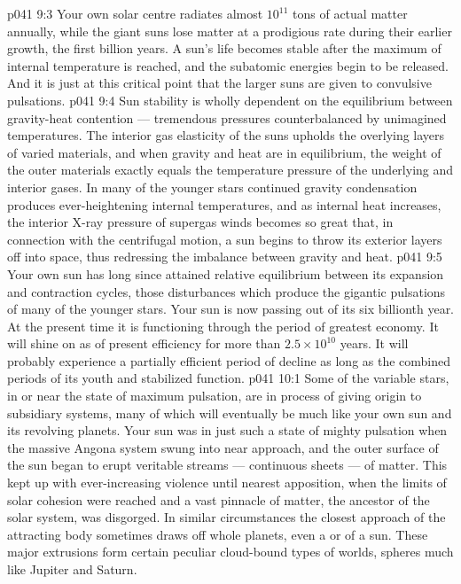 \vs p041 9:3 \pc Your own solar centre radiates almost $10^{11}$ tons of actual matter annually, while the giant suns lose matter at a prodigious rate during their earlier growth, the first billion years. A sun’s life becomes stable after the maximum of internal temperature is reached, and the subatomic energies begin to be released. And it is just at this critical point that the larger suns are given to convulsive pulsations.
\vs p041 9:4 Sun stability is wholly dependent on the equilibrium between gravity\hyp{}heat contention --- tremendous pressures counterbalanced by unimagined temperatures. The interior gas elasticity of the suns upholds the overlying layers of varied materials, and when gravity and heat are in equilibrium, the weight of the outer materials exactly equals the temperature pressure of the underlying and interior gases. In many of the younger stars continued gravity condensation produces ever\hyp{}heightening internal temperatures, and as internal heat increases, the interior X\hyp{}ray pressure of supergas winds becomes so great that, in connection with the centrifugal motion, a sun begins to throw its exterior layers off into space, thus redressing the imbalance between gravity and heat.
\vs p041 9:5 Your own sun has long since attained relative equilibrium between its expansion and contraction cycles, those disturbances which produce the gigantic pulsations of many of the younger stars. Your sun is now passing out of its six billionth year. At the present time it is functioning through the period of greatest economy. It will shine on as of present efficiency for more than $2.5 \times 10^{10}$ years. It will probably experience a partially efficient period of decline as long as the combined periods of its youth and stabilized function.
\vs p041 10:1 Some of the variable stars, in or near the state of maximum pulsation, are in process of giving origin to subsidiary systems, many of which will eventually be much like your own sun and its revolving planets. Your sun was in just such a state of mighty pulsation when the massive Angona system swung into near approach, and the outer surface of the sun began to erupt veritable streams --- continuous sheets --- of matter. This kept up with ever\hyp{}increasing violence until nearest apposition, when the limits of solar cohesion were reached and a vast pinnacle of matter, the ancestor of the solar system, was disgorged. In similar circumstances the closest approach of the attracting body sometimes draws off whole planets, even a  or  of a sun. These major extrusions form certain peculiar cloud\hyp{}bound types of worlds, spheres much like Jupiter and Saturn.
